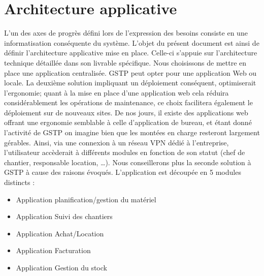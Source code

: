 \section{Architecture applicative}
        L’un des axes de progrès défini lors de l’expression des besoins consiste en une informatisation conséquente du système. L’objet du présent document est ainsi de définir l’architecture applicative mise en place. Celle-ci s’appuie sur l’architecture technique détaillée dans son livrable spécifique.
Nous choisissons de mettre en place une application centralisée. GSTP peut opter pour une application Web ou locale. La deuxième solution impliquant un déploiement conséquent, optimiserait l’ergonomie; quant à la mise en place d'une application web cela réduira considérablement les opérations de maintenance, ce choix facilitera également le déploiement sur de nouveaux sites. De nos jours, il existe des applications web offrant une ergonomie semblable à celle d'application de bureau, et étant donné l'activité de GSTP on imagine bien que les montées en charge resteront largement gérables. Ainsi, via une connexion à un réseau VPN dédié à l’entreprise, l’utilisateur accèderait à différents modules en fonction de son statut (chef de chantier, responsable location, …). Nous conseillerons plus la seconde solution à GSTP à cause des raisons évoqués.
L’application est découpée en 5 modules distincts :
\begin{itemize}
	\item Application planification/gestion du matériel
	\item Application Suivi des chantiers
	\item Application Achat/Location
	\item Application Facturation
	\item Application Gestion du stock
\end{itemize}

